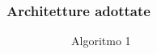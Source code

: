 \documentclass[
	usepdftitle=false,
	xcolor={table, dvipsnames},
	hyperref={
		pdftitle={Multicast totalmente e causalmente ordinato in Go},
    	pdfauthor={A. Chillotti}
    }
]{beamer}
\begin{document}
\begin{frame}
\frametitle{Architetture adottate}

\begin{figure}[ht!]
\centering
     \begin{subfigure}[ht]{0.4\textwidth}
         \centering
         \caption{Algoritmo 1}
         \label{fig:arch-1}
     \end{subfigure}
     \hfill
     \begin{subfigure}[ht]{0.4\textwidth}
         \centering

\end{subfigure}
\end{figure}
\end{frame}
\end{document}
